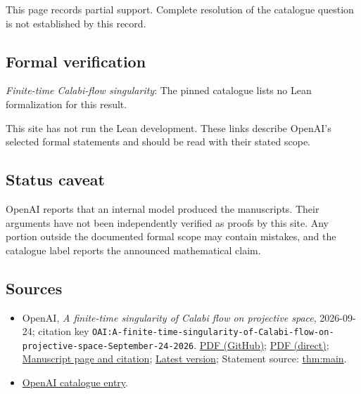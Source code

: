 \documentclass[11pt]{article}
\begin{document}
This page records partial support. Complete resolution of the catalogue question is not established by this record.

\subsection{Formal verification}
\textit{Finite-time Calabi-flow singularity}: The pinned catalogue lists no Lean formalization for this result.

This site has not run the Lean development. These links describe OpenAI’s selected formal statements and should be read with their stated scope.

\subsection{Status caveat}
OpenAI reports that an internal model produced the manuscripts. Their arguments have not been independently verified as proofs by this site. Any portion outside the documented formal scope may contain mistakes, and the catalogue label reports the announced mathematical claim.

\subsection{Sources}
\begin{itemize}
\item OpenAI, \emph{A finite-time singularity of Calabi flow on projective space}, 2026-09-24; citation key \texttt{OAI:A-finite-time-singularity-of-Calabi-flow-on-projective-space-September-24-2026}. \href{https://github.com/openai/math/blob/adc7f1241b42e322a6451854ab7e4b4c146bf78a/preprints/A-finite-time-singularity-of-Calabi-flow-on-projective-space-September-24-2026/paper.pdf}{PDF (GitHub)}; \href{https://github.com/openai/math/raw/adc7f1241b42e322a6451854ab7e4b4c146bf78a/preprints/A-finite-time-singularity-of-Calabi-flow-on-projective-space-September-24-2026/paper.pdf}{PDF (direct)}; \href{https://github.com/openai/math/blob/adc7f1241b42e322a6451854ab7e4b4c146bf78a/preprints/A-finite-time-singularity-of-Calabi-flow-on-projective-space-September-24-2026/README.md}{Manuscript page and citation}; \href{https://github.com/openai/math/blob/main/preprints/A-finite-time-singularity-of-Calabi-flow-on-projective-space-September-24-2026/paper.pdf}{Latest version}; Statement source: \href{https://github.com/openai/math/blob/adc7f1241b42e322a6451854ab7e4b4c146bf78a/preprints/A-finite-time-singularity-of-Calabi-flow-on-projective-space-September-24-2026/build/sections/introduction.tex\#L20}{thm:main}.
\item \href{https://github.com/openai/math/blob/adc7f1241b42e322a6451854ab7e4b4c146bf78a/CONTENTS.md}{OpenAI catalogue entry}.
\end{itemize}
\end{document}
